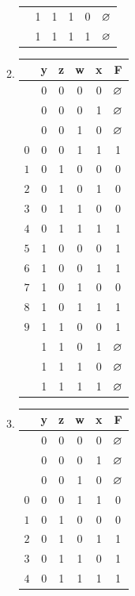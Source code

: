 \documentclass[]{../../../../tex/classes/homework}
\newcommand\DC{$\vn$}
\begin{document}
\begin{enumerate}
\begin{multicols}{3}
\begin{enumerate}
\begin{center}
\begin{tabular}{ c c c c c|c }
						   & 1 & 1 & 1 & 0 & \DC \\ 
						   & 1 & 1 & 1 & 1 & \DC
					\end{tabular}
				\end{center}
				\item \begin{center}
					\begin{tabular}{ c c c c c|c }
						\en{No.} & y & z & w & x & F \\
						\hline
						   & 0 & 0 & 0 & 0 & \DC \\ 
						   & 0 & 0 & 0 & 1 & \DC \\ 
						   & 0 & 0 & 1 & 0 & \DC \\ 
						$0$& 0 & 0 & 1 & 1 & 1 \\ 
						$1$& 0 & 1 & 0 & 0 & 0 \\ 
						$2$& 0 & 1 & 0 & 1 & 0 \\ 
						$3$& 0 & 1 & 1 & 0 & 0 \\ 
						$4$& 0 & 1 & 1 & 1 & 1 \\ 
						$5$& 1 & 0 & 0 & 0 & 1 \\ 
						$6$& 1 & 0 & 0 & 1 & 1 \\ 
						$7$& 1 & 0 & 1 & 0 & 0 \\ 
						$8$& 1 & 0 & 1 & 1 & 1 \\
						$9$& 1 & 1 & 0 & 0 & 1 \\ 
						   & 1 & 1 & 0 & 1 & \DC \\ 
						   & 1 & 1 & 1 & 0 & \DC \\ 
						   & 1 & 1 & 1 & 1 & \DC
					\end{tabular}
				\end{center}
				\columnbreak
				\item \begin{center}
					\begin{tabular}{ c c c c c|c }
						\en{No.} & y & z & w & x & F \\
						\hline
						   & 0 & 0 & 0 & 0 & \DC \\ 
						   & 0 & 0 & 0 & 1 & \DC \\ 
						   & 0 & 0 & 1 & 0 & \DC \\ 
						$0$& 0 & 0 & 1 & 1 & 0 \\ 
						$1$& 0 & 1 & 0 & 0 & 0 \\ 
						$2$& 0 & 1 & 0 & 1 & 1 \\ 
						$3$& 0 & 1 & 1 & 0 & 1 \\ 
						$4$& 0 & 1 & 1 & 1 & 1 \\ 

\end{tabular}
\end{center}
\end{enumerate}
\end{multicols}
\end{enumerate}
\end{document}
